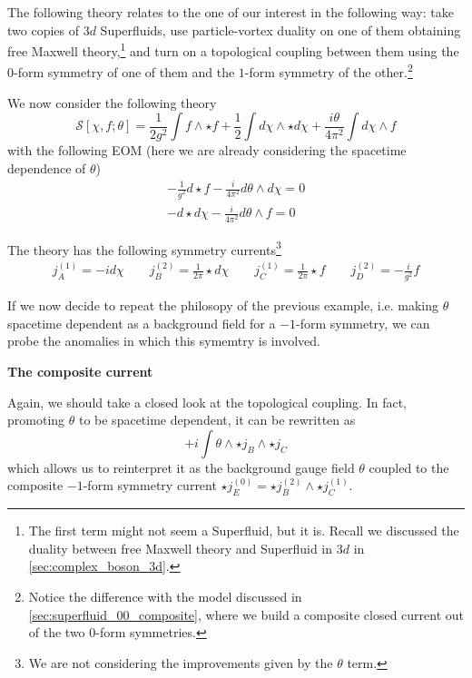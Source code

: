 \documentclass[aps,preprint,nofootinbib,preprintnumbers,eqsecnum,superscriptaddress]{revtex4}
\numberwithin{equation}{section}
\begin{document}
The following theory relates to the one of our interest in the following way: take two copies of $3d$ Superfluids, use particle-vortex duality on one of them obtaining free Maxwell theory,\footnote{The first term might not seem a Superfluid, but it is. Recall we discussed the duality between free Maxwell theory and Superfluid in $3d$ in \ref{sec:complex_boson_3d}.} and turn on a topological coupling between them using the $0$-form symmetry of one of them and the $1$-form symmetry of the other.\footnote{Notice the difference with the model discussed in \ref{sec:superfluid_00_composite}, where we build a composite closed current out of the two $0$-form symmetries.}

We now consider the following theory
\begin{equation}
\mathcal{S}[\chi, f;\theta] = \frac{1}{2 g^2} \int f \wedge \star f + \frac{1}{2} \int d\chi \wedge \star d\chi + \frac{i \theta}{4 \pi^2} \int d\chi \wedge f
\end{equation}
with the following EOM (here we are already considering the spacetime dependence of $\theta$)
\begin{align}
    -\frac{1}{g^2}d\star f - \frac{i}{4\pi^2} d\theta \wedge d\chi = 0 \\
    -d\star d \chi - \frac{i}{4\pi^2} d\theta \wedge f = 0
\end{align}

The theory has the following symmetry currents\footnote{We are not considering the improvements given by the $\theta$ term.}
\begin{align}
    j^{(1)}_A = -id\chi \qquad j^{(2)}_B = \frac{1}{2\pi}\star d\chi \qquad j^{(1)}_C = \frac{1}{2\pi} \star f \qquad j^{(2)}_D = -\frac{i}{g^2} f
\end{align}

If we now decide to repeat the philosopy of the previous example, i.e. making $\theta$ spacetime dependent as a background field for a $-1$-form symmetry, we can probe the anomalies in which this symemtry is involved.

\begin{tcolorbox}
    {\bf The composite current}
    
    Again, we should take a closed look at the topological coupling. In fact, promoting $\theta$ to be spacetime dependent, it can be rewritten as
    \begin{equation}
        +i\int \theta \wedge \star j_B \wedge \star j_C
    \end{equation}
    which allows us to reinterpret it as the background gauge field $\theta$ coupled to the composite $-1$-form symmetry current $\star j^{(0)}_E = \star j^{(2)}_B \wedge \star j^{(1)}_C$.
\end{tcolorbox}
\end{document}
